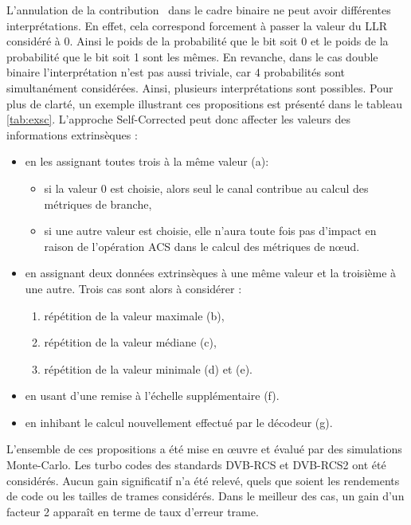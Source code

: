 \og L'annulation de la contribution \fg ~dans le cadre binaire ne peut avoir différentes interprétations. En effet, cela 
correspond forcement à passer la valeur du LLR considéré à 0. Ainsi le poids de la probabilité que le bit soit 0 et 
le poids de la probabilité que le bit soit 1 sont les mêmes. En revanche, dans le cas double binaire l'interprétation n'est 
pas aussi triviale, car 4 probabilités sont simultanément considérées. Ainsi, plusieurs interprétations sont possibles. Pour plus 
de clarté, un exemple illustrant ces propositions est présenté dans le tableau \ref{tab:exsc}. L'approche Self-Corrected 
peut donc affecter les valeurs des informations extrinsèques : 
\begin{itemize}
	\item en les assignant toutes trois à la même valeur (a):
	\begin{itemize}
		\item si la valeur 0 est choisie, alors seul le canal contribue au calcul des métriques de branche,
		\item si une autre valeur est choisie, elle n'aura toute fois pas d'impact en raison de l’opération 
		ACS dans le calcul des métriques de nœud.
	\end{itemize}
	\item en assignant deux données extrinsèques à une même valeur et la troisième à une autre. Trois cas sont alors à considérer :
	\begin{enumerate}
		\item répétition de la valeur maximale (b),
		\item répétition de la valeur médiane (c),
		\item répétition de la valeur minimale (d) et (e).
	\end{enumerate}
	\item en usant d'une remise à l'échelle supplémentaire (f).
	\item en inhibant le calcul nouvellement effectué par le décodeur (g).\\
\end{itemize}

L'ensemble de ces propositions a été mise en œuvre et évalué par des simulations Monte-Carlo. Les turbo codes des standards 
DVB-RCS et DVB-RCS2 ont été considérés. Aucun gain significatif n'a été relevé, quels que soient les rendements de code ou les tailles de 
trames considérés. Dans le meilleur des cas, un gain d'un facteur 2 apparaît en terme de taux d'erreur trame. 

